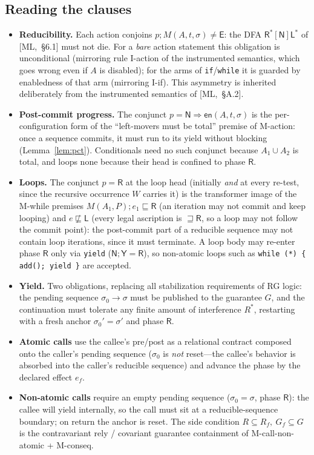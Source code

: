 \documentclass[11pt]{article}
\theoremstyle{plain}
\theoremstyle{plain}
\theoremstyle{definition}
\newcommand{\MY}{\mathsf{Y}}
\newcommand{\MR}{\mathsf{R}}
\newcommand{\ML}{\mathsf{L}}
\newcommand{\MN}{\mathsf{N}}
\newcommand{\ME}{\mathsf{E}}
\newcommand{\sq}{\sqsubseteq}
\newcommand{\nsq}{\not\sqsubseteq}
\newcommand{\en}{\mathsf{en}}
\newcommand{\code}[1]{\texttt{#1}}
\begin{document}
\subsection{Reading the clauses}

\begin{itemize}[leftmargin=1.4em]
\item \textbf{Reducibility.} Each action conjoins $p;M(A,t,\sigma)\neq\ME$: the DFA
  $\MR^*[\MN]\ML^*$ of [ML,~\S6.1] must not die. For a \emph{bare} action statement
  this obligation is unconditional (mirroring rule I-action of the instrumented
  semantics, which goes wrong even if $A$ is disabled); for the arms of
  \code{if}/\code{while} it is guarded by enabledness of that arm (mirroring
  I-if). This asymmetry is inherited deliberately from the instrumented semantics
  of [ML,~\S A.2].
\item \textbf{Post-commit progress.} The conjunct $p=\MN\Rightarrow\en(A,t,\sigma)$
  is the per-configuration form of the ``left-movers must be total'' premise of
  M-action: once a sequence commits, it must run to its yield without blocking
  (Lemma~\ref{lem:pct}). Conditionals need no such conjunct because $A_1\cup A_2$
  is total, and loops none because their head is confined to phase $\MR$.
\item \textbf{Loops.} The conjunct $p=\MR$ at the loop head (initially \emph{and}
  at every re-test, since the recursive occurrence $W$ carries it) is the
  transformer image of the M-while premises $M(A_1,P);e_1\sq\MR$ (an iteration
  may not commit and keep looping) and $e\nsq\ML$ (every legal ascription is
  $\sqsupseteq\MR$, so a loop may not follow the commit point):
  the post-commit part of a reducible sequence may not contain loop iterations,
  since it must terminate. A loop body may re-enter phase $\MR$ only via
  \code{yield} ($\MN;\MY=\MR$), so non-atomic loops such as
  \code{while (*) \{ add(); yield \}} are accepted.
\item \textbf{Yield.} Two obligations, replacing all stabilization requirements of
  RG logic: the pending sequence $\sigma_0\to\sigma$ must be published to the
  guarantee $G$, and the continuation must tolerate any finite amount of
  interference $R^*$, restarting with a fresh anchor $\sigma_0'=\sigma'$ and phase
  $\MR$.
\item \textbf{Atomic calls} use the callee's pre/post as a relational contract
  composed onto the caller's pending sequence ($\sigma_0$ is \emph{not} reset---the
  callee's behavior is absorbed into the caller's reducible sequence) and advance
  the phase by the declared effect $e_f$.
\item \textbf{Non-atomic calls} require an empty pending sequence ($\sigma_0=\sigma$,
  phase $\MR$): the callee will yield internally, so the call must sit at a
  reducible-sequence boundary; on return the anchor is reset. The side condition
  $R\subseteq R_f,\ G_f\subseteq G$ is the contravariant rely / covariant
  guarantee containment of M-call-non-atomic + M-conseq.
\end{itemize}
\end{document}
